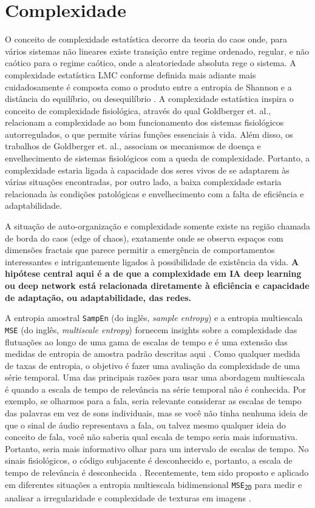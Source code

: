 \documentclass[
	12pt,				%
	openany,oneside,
	a4paper,			%
	english,			%
	brazil,				%
	]{abntex2}
\begin{document}
\section{Complexidade}
O conceito de complexidade estatística decorre da teoria do caos onde, para vários sistemas não lineares existe transição entre regime ordenado, regular, e não caótico para o regime caótico, onde a aleatoriedade absoluta rege o sistema. A complexidade estatística LMC conforme definida mais adiante mais cuidadosamente é composta como o produto entre a entropia de Shannon e a distância do equilíbrio, ou desequilíbrio \cite{c28}. A complexidade estatística inspira o conceito de complexidade fisiológica, através do qual Goldberger et. al., \cite{c29, c30, c31} relacionam a complexidade ao bom funcionamento dos sistemas fisiológicos autorregulados, o que permite várias funções essenciais à vida. Além disso, os trabalhos de Goldberger et. al., associam os mecanismos de doença e envelhecimento de sistemas fisiológicos com a queda de complexidade. Portanto, a complexidade estaria ligada à capacidade dos seres vivos de se adaptarem às várias situações encontradas, por outro lado, a baixa complexidade estaria relacionada às condições patológicas e envelhecimento com a falta de eficiência e adaptabilidade.

A situação de auto-organização e complexidade somente existe na região chamada de borda do caos (edge of chaos), exatamente onde se observa espaços com dimensões fractais que parece permitir a emergência de comportamentos interessantes e intrigantemente ligados à possibilidade de existência da vida. \textbf{A hipótese central aqui é a de que a complexidade em IA deep learning ou deep network está relacionada diretamente à eficiência e capacidade de adaptação, ou adaptabilidade, das redes.}

A entropia amostral \texttt{SampEn} (do inglês, \textit{sample entropy}) e a entropia multiescala \texttt{MSE} (do inglês, \textit{multiscale entropy}) fornecem insights sobre a complexidade das flutuações ao longo de uma gama de escalas de tempo e é uma extensão das medidas de entropia de amostra padrão descritas aqui \cite{c32,c31}. Como qualquer medida de taxas de entropia, o objetivo é fazer uma avaliação da complexidade de uma série temporal. Uma das principais razões para usar uma abordagem multiescala é quando a escala de tempo de relevância na série temporal não é conhecida. Por exemplo, se olharmos para a fala, seria relevante considerar as escalas de tempo das palavras em vez de sons individuais, mas se você não tinha nenhuma ideia de que o sinal de áudio representava a fala, ou talvez mesmo qualquer ideia do conceito de fala, você não saberia qual escala de tempo seria mais informativa. Portanto, seria mais informativo olhar para um intervalo de escalas de tempo. No sinais fisiológicos, o código subjacente é desconhecido e, portanto, a escala de tempo de relevância é desconhecida \cite{c33, c34}. Recentemente, tem sido proposto e aplicado em diferentes situações a entropia multiescala bidimensional \texttt{MSE\textsubscript{2D}} para medir e analisar a irregularidade e complexidade de texturas em imagens \cite{c35}.
\end{document}
